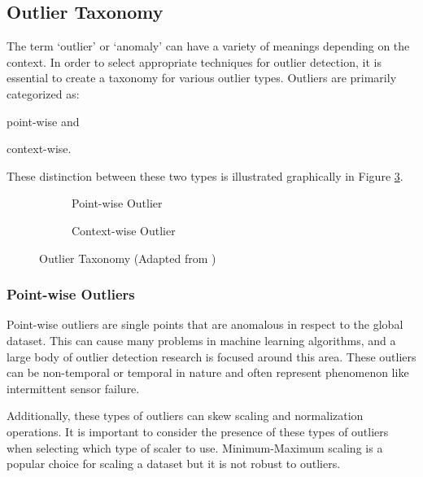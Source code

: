 \subsection{Outlier Taxonomy}
\label{ref_outlier_taxonomy}

The term `outlier' or `anomaly' can have a variety of meanings depending on the context. In order to select appropriate techniques for outlier detection, it is essential to create a taxonomy for various outlier types. Outliers are primarily categorized as:
\begin{inlinelist}
    \item point-wise and
    \item context-wise.
\end{inlinelist}
These distinction between these two types is illustrated graphically in Figure \ref{fig:outliers-graphic}.

\begin{figure}[H]
     \centering
     \begin{subfigure}[b]{0.475\textwidth}
         \centering
         {\resizebox{\textwidth}{!}{}}
         \caption{Point-wise Outlier}
         \label{fig:point}
     \end{subfigure}
     \hfill
     \begin{subfigure}[b]{0.475\textwidth}
         \centering
          {\resizebox{\textwidth}{!}{}}
         \caption{Context-wise Outlier}
         \label{fig:contextual}
     \end{subfigure}
        \caption{Outlier Taxonomy (Adapted from \cite{lai2021revisiting})}
        \label{fig:outliers-graphic}
\end{figure}

\subsubsection{Point-wise Outliers}

Point-wise outliers are single points that are anomalous in respect to the global dataset.
This can cause many problems in machine learning algorithms, and a large body of outlier detection research is focused around this area.
These outliers can be non-temporal or temporal in nature and often represent phenomenon like intermittent sensor failure.

Additionally, these types of outliers can skew scaling and normalization operations.
It is important to consider the presence of these types of outliers when selecting which type of scaler to use.
Minimum-Maximum scaling is a popular choice for scaling a dataset but it is not robust to outliers.

